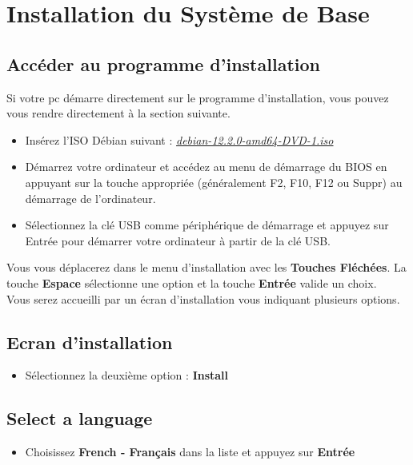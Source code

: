 \chapter{Installation du Système de Base}

\section{Accéder au programme d'installation}

Si votre pc démarre directement sur le programme d'installation, vous pouvez vous rendre directement à la section suivante.

\begin{itemize}
\item Insérez l'ISO Débian suivant : \textit{\href{https://cdimage.debian.org/debian-cd/current/amd64/iso-dvd/debian-12.2.0-amd64-DVD-1.iso}{debian-12.2.0-amd64-DVD-1.iso}}
\item Démarrez votre ordinateur et accédez au menu de démarrage du BIOS en appuyant sur la touche appropriée (généralement F2, F10, F12 ou Suppr) au démarrage de l'ordinateur.
\item Sélectionnez la clé USB comme périphérique de démarrage et appuyez sur Entrée pour démarrer votre ordinateur à partir de la clé USB.\\
\end{itemize}

Vous vous déplacerez dans le menu d'installation avec les \textbf{Touches Fléchées}. La touche \textbf{Espace} sélectionne une option et la touche \textbf{Entrée} valide un choix.\\

Vous serez accueilli par un écran d'installation vous indiquant plusieurs options.

\section{Ecran d'installation}
\begin{itemize}
	\item Sélectionnez la deuxième option : \textbf{Install}
\end{itemize}

\section{Select a language}
\begin{itemize}
	\item Choisissez \textbf{French - Français} dans la liste et appuyez sur \textbf{Entrée}
\end{itemize}

